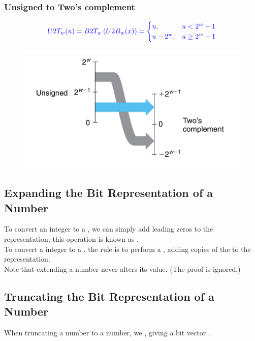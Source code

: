 \subsubsection*{Unsigned to Two's complement}
\begin{equation}
{\color{blue}{U2T_w(u) = B2T_w\left(U2B_w(x)\right) = 
\begin{cases} 
u, & u < 2^w-1 \\
u - 2^w, & u \geq 2^w-1 
\end{cases}}}
\end{equation}
\begin{figure}[H]
\centering
\includegraphics[width=0.4\linewidth]{images/u2t}
\label{fig:u2t}
\end{figure}

\subsection{Expanding the Bit Representation of a Number}
To convert an {\color{blue}{unsigned}} integer to a {\color{blue}{larger data type}}, we can simply add leading zeros to the representation; this operation is known as {\color{blue}{zero extension}}.\\

To convert a {\color{blue}{two’s complement}} integer to a {\color{blue}{larger data type}}, the rule is to perform a {\color{blue}{sign extension}}, adding copies of the {\color{blue}{most significant bit}} to the representation.\\

Note that extending a number never alters its value. (The proof is ignored.)

\subsection{Truncating the Bit Representation of a Number}
When truncating a {\color{blue}{$w$-bit}} number {\color{blue}{$x = [x_{w-1} , x_{w-2} ,\dots, x_0]$}} to a {\color{blue}{$k$-bit}} number, we {\color{blue}{drop the high-order $w - k$ bits}}, giving a bit vector {\color{blue}{$x' = [x_{k-1}, x_{k-2}, \dots, x_0]$}}.\\

